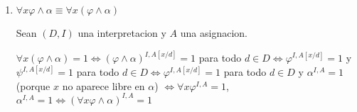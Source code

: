\begin{example}
\begin{enumerate}
		\item \(\forall x \varphi \wedge  \alpha \equiv \forall  x (\varphi \wedge  \alpha)\)

		      Sean \((D,I )\) una interpretacion y \(A \) una asignacion.

		      \(\forall x (\varphi \wedge  \alpha) = 1 \iff (\varphi \wedge  \alpha)^{I,A[x / d]} = 1  \) para todo \(d \in D  \iff \varphi^{I,A[x / d]} = 1 \) y \(\psi^{I,A[x/ d]} = 1  \) para todo \(d \in  D \iff \varphi^{I,A[x / d ]} = 1 \) para todo \(d \in D \) y \(\alpha^{I,A }  = 1 \) (porque \(x \) no aparece libre en \(\alpha\)) \(\iff \forall x \varphi^{I,A} = 1 \), \(\alpha^{I,A} = 1 \iff (\forall x \varphi \wedge \alpha)^{I,A} = 1 \)
	\end{enumerate}
\end{example}

